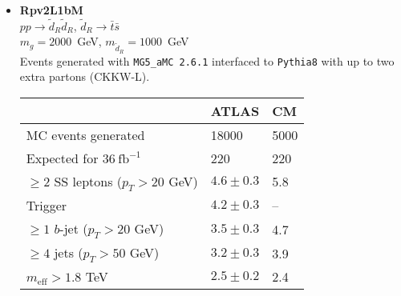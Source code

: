 \documentclass[10pt,fleqn]{article}
\newcommand{\meff}{m_\mathrm{eff}}
\begin{document}
\begin{itemize}
\item \textbf{Rpv2L1bM}\\ $ p p \to \tilde{d}_R \tilde{d}_R $, $\tilde{d}_R \to \bar{t} \bar{s}$\\
 $m_{g} = 2000$~GeV, $m_{\tilde{d}_R} = 1000$~GeV\\
 Events generated with \texttt{MG5\_aMC 2.6.1} interfaced to \texttt{Pythia8} with up to two extra partons (CKKW-L).
 \begin{tabular}{l|p{3cm}|p{3cm}} \toprule
                                           &  ATLAS           & CM  \\ \midrule
 MC events generated                       &  18000          & 5000 \\ \midrule
 Expected for $36\ \mathrm{fb}^{-1}$       &  220            & 220  \\
 $\geq 2$ SS leptons ($p_T > 20$ GeV)      & $4.6\pm 0.3$   & 5.8  \\
 Trigger                                   & $4.2 \pm 0.3$   &  --\\
 $\geq 1$ $b$-jet ($p_T > 20$ GeV)         & $3.5 \pm 0.3$   &  4.7\\
 $\geq 4$ jets ($p_T > 50$ GeV)            & $3.2 \pm 0.3$   &  3.9\\
 $\meff  > 1.8$ TeV                         & $2.5 \pm 0.2$   &  2.4\\   \bottomrule 
 \end{tabular}       
 
\end{itemize}

 
\end{document}
